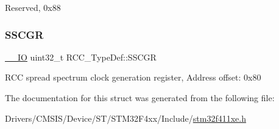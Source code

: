 Reserved, 0x88 \mbox{\label{struct_r_c_c___type_def_a52270ad1423c68cd536f62657bb669f5}} 
\subsubsection{\texorpdfstring{S\+S\+C\+GR}{SSCGR}}
{\footnotesize\ttfamily \hyperlink{core__sc300_8h_aec43007d9998a0a0e01faede4133d6be}{\+\_\+\+\_\+\+IO} uint32\+\_\+t R\+C\+C\+\_\+\+Type\+Def\+::\+S\+S\+C\+GR}

R\+CC spread spectrum clock generation register, Address offset\+: 0x80 

The documentation for this struct was generated from the following file\+:\begin{DoxyCompactItemize}
\item 
Drivers/\+C\+M\+S\+I\+S/\+Device/\+S\+T/\+S\+T\+M32\+F4xx/\+Include/\hyperlink{stm32f411xe_8h}{stm32f411xe.\+h}\end{DoxyCompactItemize}
